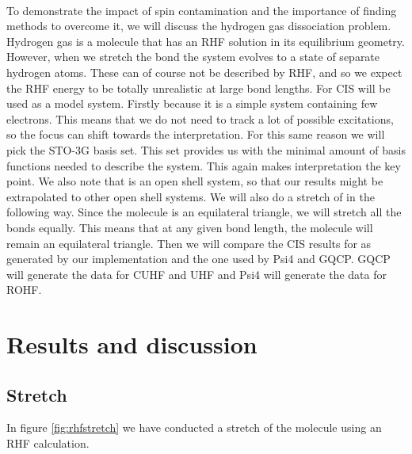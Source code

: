 \documentclass[twoside,twocolumn,9pt]{article}
\begin{document}
\paragraph*{}
To demonstrate the impact of spin contamination and the importance of finding methods to overcome it, we will discuss the hydrogen gas dissociation problem\cite{Szabo1996}. Hydrogen
gas is a molecule that has an RHF solution in its equilibrium geometry. However, when we stretch the bond the system evolves to a state of separate hydrogen atoms. These can of 
course not be described by RHF, and so we expect the RHF energy to be totally unrealistic at large bond lengths.
For CIS  will be used as a model system. Firstly because it is a simple system containing few electrons. This means that we do not need to track a lot of possible excitations, 
so the focus can shift towards the interpretation. For this same reason we will pick the STO-3G basis set. This set provides us with the minimal amount of basis functions needed to
describe the system. This again makes interpretation the key point. We also note that  is an open shell system, so that our results might be extrapolated to other open shell
systems. We will also do a stretch of  in the following way. Since the molecule is an equilateral triangle, we will stretch all the bonds equally. This means that at any given
bond length, the molecule will remain an equilateral triangle. Then we will compare the CIS results for  as generated by our implementation and the one used by Psi4 and GQCP. 
GQCP will generate the data for CUHF and UHF and Psi4 will generate the data for ROHF.

\section{Results and discussion}
\label{sec:results}

\subsection{ Stretch}
\label{subsec:h2}
 In figure \ref{fig:rhfstretch} we have conducted a stretch of the  molecule using an RHF calculation.
\end{document}
